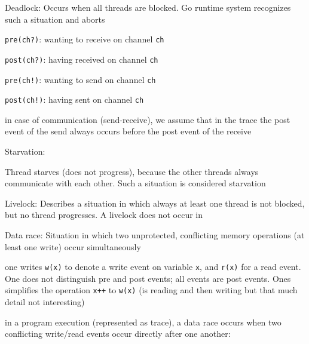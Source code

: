 \documentclass[landscape, a4paper]{article}
\begin{document}
\begin{minipage}[t]{0.2\linewidth}
\begin{betterlist}
		\item \alert{Deadlock:} Occurs when all threads are blocked. Go runtime system recognizes such a situation and aborts
		\begin{betterlist}
			\item \verb|pre(ch?)|: wanting to receive on channel \verb|ch|
			\item \verb|post(ch?)|: having received on channel \verb|ch|
			\item \verb|pre(ch!)|: wanting to send on channel \verb|ch|
			\item \verb|post(ch!)|: having sent on channel \verb|ch|
			\item in case of communication (send-receive), we assume that in the trace the post event of the send always occurs before the post event of the receive
		\end{betterlist}
		\item \alert{Starvation:}
		\begin{betterlist}
			\item Thread starves (does not progress), because the other threads always communicate with each other. Such a situation is considered starvation
		\end{betterlist}
		\item \alert{Livelock:} Describes a situation in which always at least one thread is not blocked, but no thread progresses. A livelock does not occur in 
		\item \alert{Data race:} Situation in which two unprotected, conflicting memory operations (at least one write) occur simultaneously
		\begin{betterlist}
			\item one writes \verb|w(x)| to denote a write event on variable \verb|x|, and \verb|r(x)| for a read event. One does not distinguish pre and post events; all events are post events. Ones simplifies the operation \verb|x++| to \verb|w(x)| (is reading and then writing but that much detail not interesting)
			\item in a program execution (represented as trace), a data race occurs when two conflicting write/read events occur directly after one another:


\end{betterlist}
\end{betterlist}
\end{minipage}
\end{document}
